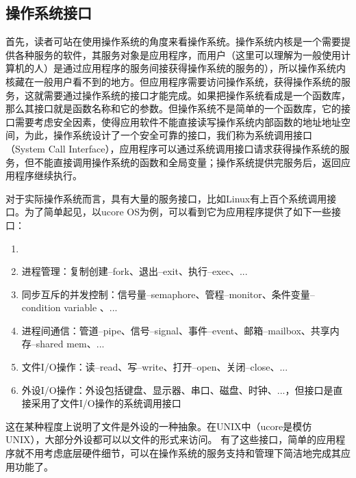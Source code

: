 \subsection{操作系统接口}

首先，读者可站在使用操作系统的角度来看操作系统。操作系统内核是一个需要提供各种服务的软件，其服务对象是应用程序，而用户（这里可以理解为一般使用计算机的人）是通过应用程序的服务间接获得操作系统的服务的），所以操作系统内核藏在一般用户看不到的地方。但应用程序需要访问操作系统，获得操作系统的服务，这就需要通过操作系统的接口才能完成。如果把操作系统看成是一个函数库，那么其接口就是函数名称和它的参数。但操作系统不是简单的一个函数库，它的接口需要考虑安全因素，使得应用软件不能直接读写操作系统内部函数的地址地址空间，为此，操作系统设计了一个安全可靠的接口，我们称为系统调用接口（System Call Interface），应用程序可以通过系统调用接口请求获得操作系统的服务，但不能直接调用操作系统的函数和全局变量；操作系统提供完服务后，返回应用程序继续执行。

对于实际操作系统而言，具有大量的服务接口，比如Linux有上百个系统调用接口。为了简单起见，以ucore OS为例，可以看到它为应用程序提供了如下一些接口：

\begin{enumerate}
	\item 
	\item  进程管理：复制创建--fork、退出--exit、执行--exec、...
	\item  同步互斥的并发控制：信号量--semaphore、管程--monitor、条件变量--condition variable 、...
	\item  进程间通信：管道--pipe、信号--signal、事件--event、邮箱--mailbox、共享内存--shared mem、...
	\item  文件I/O操作：读--read、写--write、打开--open、关闭--close、...
	\item  外设I/O操作：外设包括键盘、显示器、串口、磁盘、时钟、...，但接口是直接采用了文件I/O操作的系统调用接口
\end{enumerate}


这在某种程度上说明了文件是外设的一种抽象。在UNIX中（ucore是模仿UNIX），大部分外设都可以以文件的形式来访问。
有了这些接口，简单的应用程序就不用考虑底层硬件细节，可以在操作系统的服务支持和管理下简洁地完成其应用功能了。






